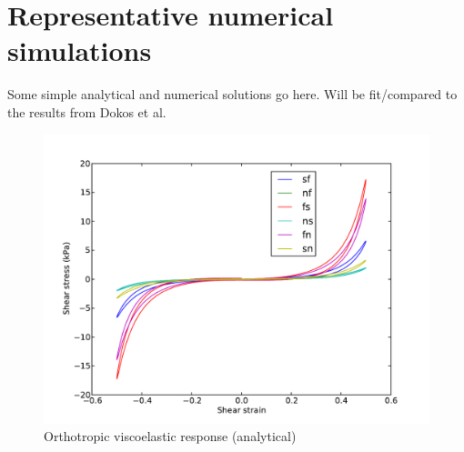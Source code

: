 \section{Representative numerical simulations}
\label{numerical-simulations}

Some simple analytical and numerical solutions go here. Will be
fit/compared to the results from Dokos et al.

\clearpage
\begin{figure}
  \centering
  \includegraphics[width=\textwidth]
                  {images/pdf/orthotropic-viscoelasticity}
  \caption{Orthotropic viscoelastic response (analytical)}
  \label{analytica-orthotropic-viscoelasticity}
\end{figure}

%


